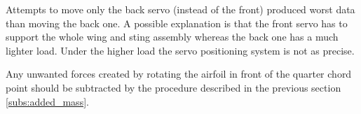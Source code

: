 \par Attempts to move only the back servo (instead of the front) produced worst data than moving the back one.
A possible explanation is that the front servo has to support the whole wing and sting assembly whereas the back one has a much lighter load.
Under the higher load the servo positioning system is not as precise.

\par Any unwanted forces created by rotating the airfoil in front of the quarter chord point should be subtracted by the procedure described in the previous section \ref{subs:added_mass}.

